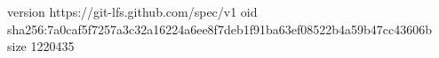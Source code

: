 version https://git-lfs.github.com/spec/v1
oid sha256:7a0caf5f7257a3c32a16224a6ee8f7deb1f91ba63ef08522b4a59b47cc43606b
size 1220435

